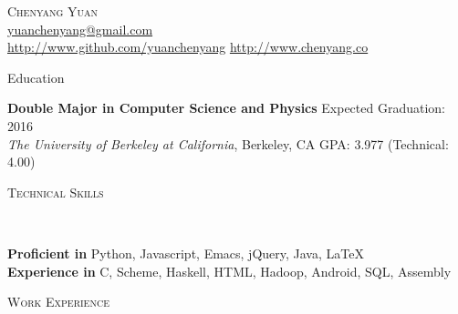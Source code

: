 \documentclass[9pt]{article}
\newenvironment{changemargin}[2]{%
  \begin{list}{}{%
      \setlength{\topsep}{0pt}%
      \setlength{\leftmargin}{#1}%
      \setlength{\rightmargin}{#2}%
      \setlength{\listparindent}{\parindent}%
      \setlength{\itemindent}{\parindent}%
      \setlength{\parsep}{\parskip}%
    }%
  \item[]}{\end{list}
}
\newcommand{\lineover}{
  \begin{changemargin}{-0.05in}{-0.05in}
    \vspace*{-8pt}
    \hrulefill \\
    \vspace*{-2pt}
  \end{changemargin}
}
\newcommand{\header}[1]{
  \begin{changemargin}{-0.5in}{-0.5in}
    \scshape{#1}\\
    \lineover
  \end{changemargin}
}
\newcommand{\contact}[4]{
  \begin{changemargin}{-0.5in}{-0.5in}
    \begin{center}
      {\Large \scshape {#1}}\\ \smallskip
      {#2}\\ \smallskip
      {#3}\\ \smallskip
      {#4}\smallskip
    \end{center}
  \end{changemargin}
}
\newenvironment{body} {
  \vspace*{-16pt}
  \begin{changemargin}{-0.25in}{-0.5in}
  }
  {\end{changemargin}
}
\begin{document}
\contact{Chenyang Yuan}{\href{mailto:yuanchenyang@gmail.com}{yuanchenyang@gmail.com}}{ \url{http://www.github.com/yuanchenyang} \quad \url{http://www.chenyang.co}}

\header{Education}

\begin{body}
  \vspace{14pt}
  \textbf{Double Major in Computer Science and Physics} \hfill Expected Graduation: 2016 \\
  \emph{The University of Berkeley at California}, Berkeley, CA{} \hfill GPA: 3.977 (Technical: 4.00)\\
\end{body}

\smallskip

\header{Technical Skills}

\begin{body}
  \vspace{14pt}
  \textbf{Proficient in} Python, Javascript, Emacs, jQuery, Java, \LaTeX \\
  \textbf{Experience in} C, Scheme, Haskell, HTML, Hadoop, Android, SQL, Assembly
\end{body}

\smallskip



\header{Work Experience}
\end{document}

